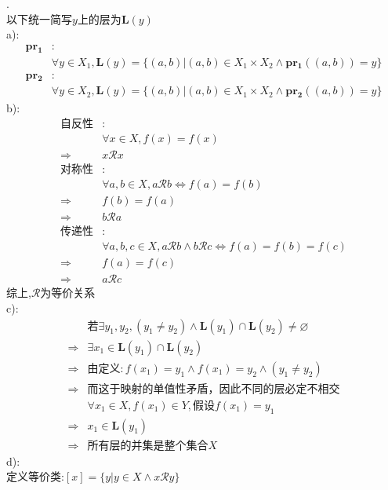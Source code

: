 \begin{solution}.\\
\label{def:b1-c1-s3-q2-brieflayer}
以下统一简写$y$上的层为$\mathbf{L} (y)$\\
a):\\
\begin{align*}
\mathbf{pr_1}&:\\
&\forall y\in X_1,\mathbf{L} (y)=\{(a,b)| (a,b)\in X_1\times X_2\land \mathbf{pr_1}((a,b))=y\}\\
\mathbf{pr_2}&:\\
&\forall y\in X_2,\mathbf{L} (y)=\{(a,b)| (a,b)\in X_1\times X_2\land \mathbf{pr_2}((a,b))=y\}
\end{align*}
b):\\
\begin{align*}
\text{自反性}&:\\
&\forall x\in X,f(x)=f(x)\\
\Rightarrow&x\mathcal{R}x\\
\text{对称性}&:\\
&\forall a,b\in X, a\mathcal{R}b\Leftrightarrow f(a)=f(b)\\
\Rightarrow& f(b)=f(a)\\
\Rightarrow& b\mathcal{R}a\\
\text{传递性}&:\\
&\forall a,b,c\in X,a\mathcal{R}b\land b\mathcal{R}c\Leftrightarrow f(a)=f(b)=f(c)\\
\Rightarrow&f(a)=f(c)\\
\Rightarrow&a\mathcal{R}c
\end{align*}
综上,$\mathcal{R}$为等价关系\\
c):\\
\begin{align*}
&\text{若}\exists y_1,y_2,(y_1\neq y_2)\land \mathbf{L}(y_1)\cap \mathbf{L}(y_2)\neq \varnothing\\
\Rightarrow & \exists x_1\in \mathbf{L}(y_1)\cap \mathbf{L}(y_2)\\
\Rightarrow &\text{由定义}: f(x_1)=y_1\land f(x_1)=y_2\land(y_1\neq y_2)\\
\Rightarrow &\text{而这于映射的单值性矛盾，因此不同的层必定不相交}\\
&\forall x_1\in X,f(x_1)\in Y,\text{假设}f(x_1)=y_1\\
\Rightarrow& x_1\in \mathbf{L}(y_1)\\
\Rightarrow&\text{所有层的并集是整个集合}X
\end{align*}
d):\\
定义等价类:$[x]=\{y|y\in X \land x\mathcal{R}y\}$\\

\end{solution}
